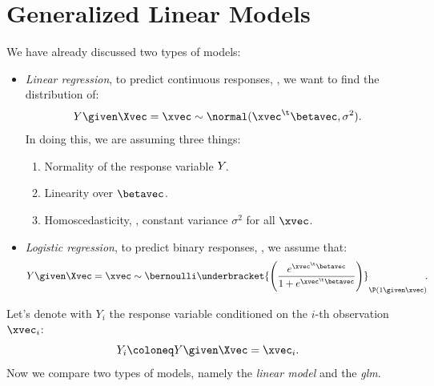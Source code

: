 \section{Generalized Linear Models}

We have already discussed two types of models:
\begin{itemize}
    \item \emph{Linear regression}, to predict continuous responses, \ie, we want to find the distribution of: \begin{equation}
              Y \given \Xvec = \xvec \sim \normal(\xvec^\t\betavec, \sigma^2).
          \end{equation}
          In doing this, we are assuming three things:
          \begin{enumerate}
              \item Normality of the response variable $Y\negthinspace$.
              \item Linearity over $\betavec$.
              \item Homoscedasticity, \ie, constant variance $\sigma^2$ for all $\xvec$.
          \end{enumerate}
    \item \emph{Logistic regression}, to predict binary responses, \ie, we assume that:
          \begin{equation}
              Y \given \Xvec = \xvec \sim \bernoulli\underbracket{\left(\frac{e^{\xvec^\t\betavec}}{1 + e^{\xvec^\t\betavec}}\right)}_{\P(1\given \xvec)}\negmedspace.
          \end{equation}
\end{itemize}

Let's denote with $Y_i$ the response variable conditioned on the $i$-th observation $\xvec_i$:
\begin{equation}
    Y_i \coloneq Y \given \Xvec = \xvec_i.
\end{equation}
Now we compare two types of models, namely the \emph{linear model} and the \textit{\acs{glm}}.

